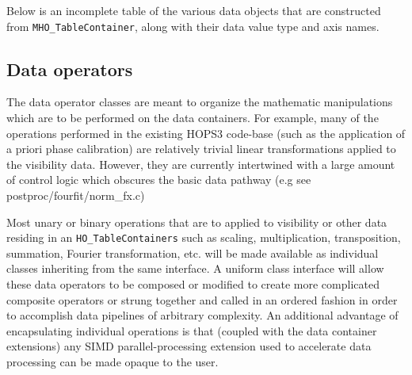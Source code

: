 Below is an incomplete table of the various data objects that are constructed from \texttt{MHO\_TableContainer}, along with their data value type and axis names.
\begin{center}
\end{center}

\subsection{Data operators}

The data operator classes are meant to organize the mathematic manipulations which are to be performed on the data containers. For example, many of the operations performed in the existing HOPS3 code-base (such as the application of a priori phase calibration) are relatively trivial linear transformations applied to the visibility data. However, they are currently intertwined with a large amount of control logic which obscures the basic data pathway (e.g see postproc/fourfit/norm\_fx.c)

Most unary or binary operations that are to applied to visibility or other data residing in an \texttt{HO\_TableContainers} such as scaling, multiplication, transposition, summation, Fourier transformation, etc. will be made available as individual classes inheriting from the same interface. A uniform class interface will allow these data operators to be composed or modified to create more complicated composite operators or strung together and called in an ordered fashion in order to accomplish data pipelines of arbitrary complexity. An additional advantage of encapsulating individual operations is that (coupled with the data container extensions) any SIMD parallel-processing extension used to accelerate data processing can be made opaque to the user.

